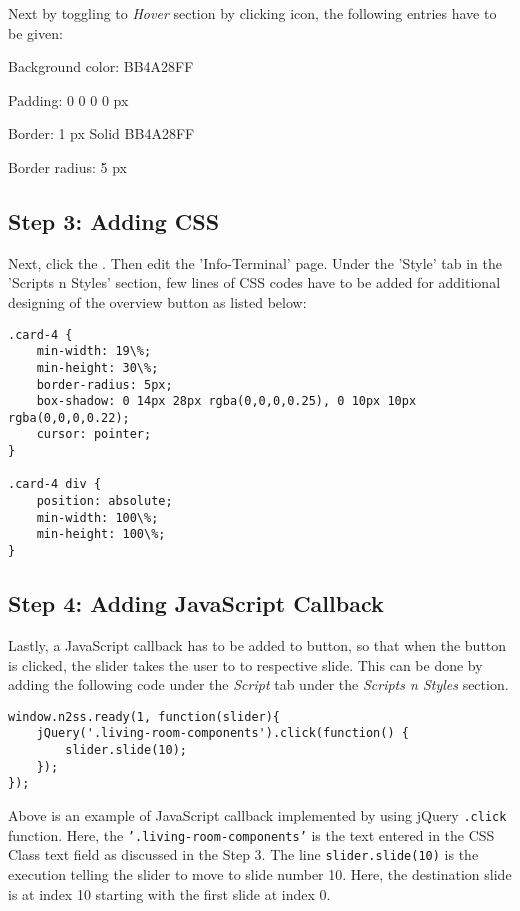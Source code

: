 Next by toggling to \emph{Hover} section by clicking  icon, the following entries have to be given:
\begin{itemize*}
\item Background color: BB4A28FF
\item Padding: 0 0 0 0 px
\item Border: 1 px Solid BB4A28FF
\item Border radius: 5 px
\end{itemize*}

\subsection*{Step 3: Adding CSS}
Next, click the . Then edit the 'Info-Terminal' page. Under the 'Style' tab in the 'Scripts n Styles' section, few lines of CSS codes have to be added for additional designing of the overview button as listed below:
\begin{lstlisting}
.card-4 {
	min-width: 19\%;
	min-height: 30\%;
	border-radius: 5px;
	box-shadow: 0 14px 28px rgba(0,0,0,0.25), 0 10px 10px rgba(0,0,0,0.22);
	cursor: pointer;
}

.card-4 div {
	position: absolute;
	min-width: 100\%;
	min-height: 100\%;
}
\end{lstlisting}

\subsection*{Step 4: Adding JavaScript Callback}
Lastly, a JavaScript callback has to be added to button, so that when the button is clicked, the slider takes the user to to respective slide. This can be done by adding the following code under the \emph{Script} tab under the \emph{Scripts n Styles} section.

\begin{lstlisting}
window.n2ss.ready(1, function(slider){
	jQuery('.living-room-components').click(function() {
		slider.slide(10);
	});
});
\end{lstlisting}

Above is an example of JavaScript callback implemented by using jQuery \texttt{.click} function. Here, the \texttt{'.living-room-components'} is the text entered in the CSS Class text field as discussed in the Step 3. The line \texttt{slider.slide(10)} is the execution telling the slider to move to slide number 10. Here, the destination slide is at index 10 starting with the first slide at index 0.

